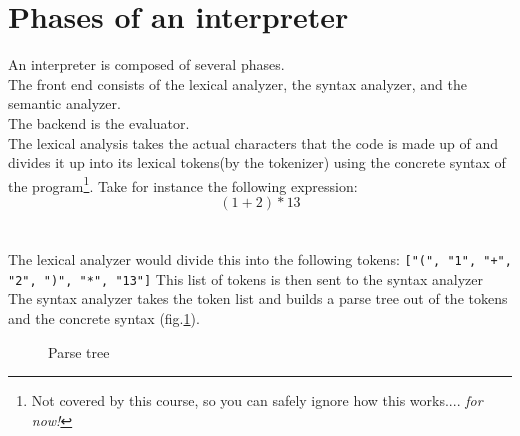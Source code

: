 \section{Phases of an interpreter}
An interpreter is composed of several phases. \\
The front end consists of the lexical analyzer, the syntax analyzer, and the semantic analyzer.\\
The backend is the evaluator.\\
The \gls{lexical analysis} takes the actual characters that the code is made up of and divides it up into its lexical tokens(by the tokenizer) using the concrete syntax of the program\footnote{Not covered by this course, so you can safely ignore how this works.... \textit{for now!}}. 
Take for instance the following expression:
\\
\begin{equation*}
    (1+2)*13
\end{equation*}\\
\\
The lexical analyzer would divide this into the following tokens:
\texttt{["(", "1", "+", "2", ")", "*", "13"]}
\newpage
This list of tokens is then sent to the \gls{syntax analyzer}\\
The syntax analyzer takes the token list and builds a parse tree out of the tokens and the concrete syntax (fig.\ref{fig:parsetree}).
\begin{figure}[!h]
    \centering
    \caption{Parse tree}
    \label{fig:parsetree}
\end{figure}

